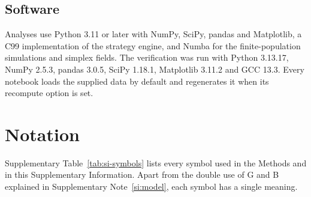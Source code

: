 \documentclass[10pt]{wlscirep}
\theoremstyle{plain}
\theoremstyle{remark}
\begin{document}
\subsection{Software}

Analyses use Python 3.11 or later with NumPy, SciPy, pandas and Matplotlib, a C99 implementation of the strategy engine, and Numba for the finite-population simulations and simplex fields. The verification was run with Python 3.13.17, NumPy 2.5.3, pandas 3.0.5, SciPy 1.18.1, Matplotlib 3.11.2 and GCC 13.3. Every notebook loads the supplied data by default and regenerates it when its recompute option is set.

\FloatBarrier
\section{Notation}
\label{si:notation}

Supplementary Table~\ref{tab:si-symbols} lists every symbol used in the Methods and in this Supplementary Information. Apart from the double use of G and B explained in Supplementary Note~\ref{si:model}, each symbol has a single meaning.
\end{document}
